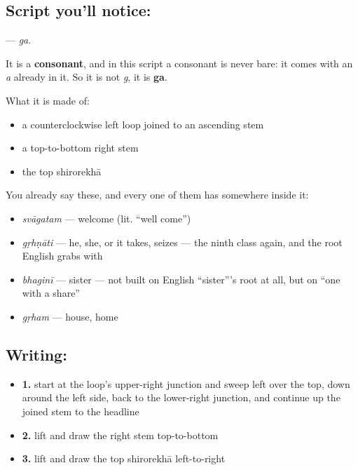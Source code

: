 \subsection*{Script you'll notice: }
\textbf{} — \emph{ga}.

It is a \textbf{consonant}, and in this script a consonant is never bare: it comes with an \emph{a} already in it. So it is not \emph{g}, it is \textbf{ga}.

What it is made of:

\begin{itemize}
\raggedright
  \item a counterclockwise left loop joined to an ascending stem
  \item a top-to-bottom right stem
  \item the top shirorekhā
\end{itemize}

You already say these, and every one of them has  somewhere inside it:

\begin{itemize}
\raggedright
  \item \textbf{} \emph{svāgatam} — welcome (lit. \textquotedblleft{}well come\textquotedblright{})
  \item \textbf{} \emph{gṛhṇāti} — he, she, or it takes, seizes — the ninth class again, and the root English grabs with
  \item \textbf{} \emph{bhaginī} — sister — not built on English \textquotedblleft{}sister\textquotedblright{}'s root at all, but on \textquotedblleft{}one with a share\textquotedblright{}
  \item \textbf{} \emph{gṛham} — house, home
\end{itemize}

\subsection*{Writing: }

\begin{itemize}
\raggedright
  \item \textbf{1.} start at the loop's upper-right junction and sweep left over the top, down around the left side, back to the lower-right junction, and continue up the joined stem to the headline
  \item \textbf{2.} lift and draw the right stem top-to-bottom
  \item \textbf{3.} lift and draw the top shirorekhā left-to-right
\end{itemize}

